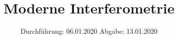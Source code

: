 
\usepackage{longtable}
\usepackage{wrapfig}
\usepackage{ dsfont }
\subject{VERSUCH 64}
\title{Moderne Interferometrie}
\date{%
  \hspace{-2.5em}
  Durchführung: 06.01.2020
  \hspace{4em}
  Abgabe: 13.01.2020
}


  \setlength{\parindent}{0em}
  \maketitle
  \thispagestyle{empty}
  \newpage
  \tableofcontents
  \newpage





\printbibliography{}
%


